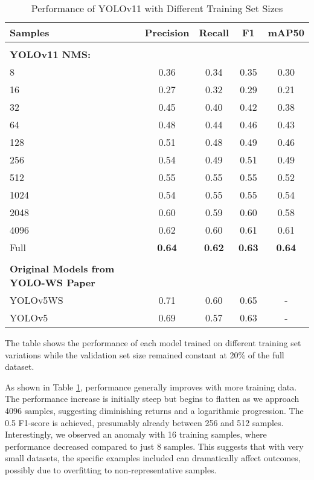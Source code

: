 \documentclass{article}  %
\begin{document}
\begin{table}[htbp]
\caption{Performance of YOLOv11 with Different Training Set Sizes}
\begin{center}
\small
\begin{tabular*}{\linewidth}{@{\extracolsep{\fill}}lcccc@{}}
\hline
\textbf{Samples} & \textbf{Precision} & \textbf{Recall} & \textbf{F1} & \textbf{mAP50}\\
\hline \\
\textbf{YOLOv11 NMS:} \\
8 & 0.36 & 0.34 & 0.35 & 0.30 \\
16 & 0.27 & 0.32 & 0.29 & 0.21 \\
32 & 0.45 & 0.40 & 0.42 & 0.38 \\
64 & 0.48 & 0.44 & 0.46 & 0.43 \\
128 & 0.51 & 0.48 & 0.49 & 0.46 \\
256 & 0.54 & 0.49 & 0.51 & 0.49 \\
512 & 0.55 & 0.55 & 0.55 & 0.52 \\
1024 & 0.54 & 0.55 & 0.55 & 0.54 \\
2048 & 0.60 & 0.59 & 0.60 & 0.58 \\
4096 & 0.62 & 0.60 & 0.61 & 0.61 \\
Full & \textbf{0.64} & \textbf{0.62} & \textbf{0.63} & \textbf{0.64} \\
\hline \\
\textbf{Original Models from YOLO-WS Paper} \\
YOLOv5WS & 0.71 & 0.60 & 0.65 & - \\
YOLOv5 & 0.69 & 0.57 & 0.63 & - \\
\hline
\end{tabular*}
\scriptsize The table shows the performance of each model trained on different training set variations while the validation set size remained constant at 20\% of the full dataset.
\label{tab:training-size}
\end{center}
\end{table}

As shown in Table \ref{tab:training-size}, performance generally improves with more training data. The performance increase is initially steep but begins to flatten as we approach 4096 samples, suggesting diminishing returns and a logarithmic progression. The 0.5 F1-score is achieved, presumably already between 256 and 512 samples. Interestingly, we observed an anomaly with 16 training samples, where performance decreased compared to just 8 samples. This suggests that with very small datasets, the specific examples included can dramatically affect outcomes, possibly due to overfitting to non-representative samples. 
\end{document}
